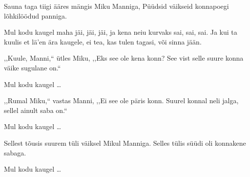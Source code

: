 Sauna taga tiigi \"a\"ares
m\"angis Miku Manniga,
P\"u\"udsid v\"aikseid konnapoegi 
l\~ohkil\"o\"odud panniga.

Mul kodu kaugel maha j\"ai, j\"ai, j\"ai,
ja kena neiu kurvaks sai, sai, sai.
Ja kui ta kuulis et l\"a'en \"ara kaugele,
ei tea, kas tulen tagasi, v\~oi sinna j\"a\"an.

,,Kuule, Manni,{``} \"utles Miku,
,,Eks see ole kena konn?
See vist selle suure konna 
v\"aike sugulane on.{``}

Mul kodu kaugel \ldots

,,Rumal Miku,{``} vastas Manni,
,,Ei see ole p\"aris konn.
Suurel konnal neli jalga, 
sellel ainult saba on.{``}

Mul kodu kaugel \ldots

Sellest t\~ousis suurem t\"uli
v\"aiksel Mikul Manniga.
Selles t\"ulis s\"u\"udi oli 
konnakene sabaga.

Mul kodu kaugel \ldots
